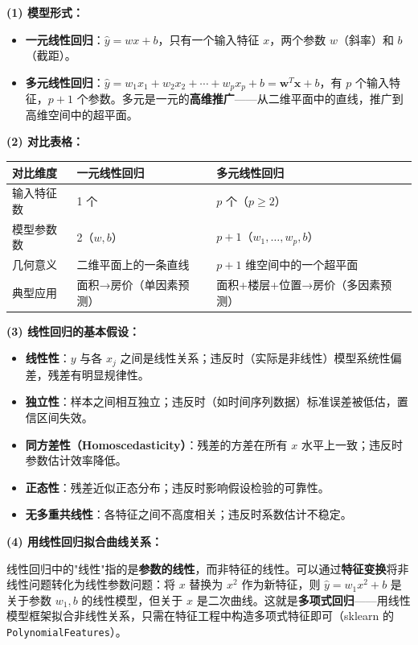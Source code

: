 \documentclass[a4paper,11pt]{ctexart}
\begin{document}
\begin{solutionbox}[参考答案与详细解析]
    \textbf{(1) 模型形式：}
    \begin{itemize}
        \item \textbf{一元线性回归}：$\hat{y} = wx + b$，只有一个输入特征 $x$，两个参数 $w$（斜率）和 $b$（截距）。
        \item \textbf{多元线性回归}：$\hat{y} = w_1 x_1 + w_2 x_2 + \cdots + w_p x_p + b = \boldsymbol{w}^T\boldsymbol{x} + b$，有 $p$ 个输入特征，$p+1$ 个参数。多元是一元的\textbf{高维推广}——从二维平面中的直线，推广到高维空间中的超平面。
    \end{itemize}

    \textbf{(2) 对比表格：}
    \begin{center}
    \begin{tabular}{p{3cm} p{4.5cm} p{4.5cm}}
        \toprule
        对比维度 & 一元线性回归 & 多元线性回归 \\
        \midrule
        输入特征数 & 1 个 & $p$ 个（$p \geq 2$） \\[0.6em]
        模型参数数 & 2（$w, b$） & $p+1$（$w_1,\ldots,w_p, b$） \\[0.6em]
        几何意义 & 二维平面上的一条直线 & $p+1$ 维空间中的一个超平面 \\[0.6em]
        典型应用 & 面积→房价（单因素预测） & 面积+楼层+位置→房价（多因素预测） \\
        \bottomrule
    \end{tabular}
    \end{center}

    \textbf{(3) 线性回归的基本假设：}
    \begin{itemize}
        \item \textbf{线性性}：$y$ 与各 $x_j$ 之间是线性关系；违反时（实际是非线性）模型系统性偏差，残差有明显规律性。
        \item \textbf{独立性}：样本之间相互独立；违反时（如时间序列数据）标准误差被低估，置信区间失效。
        \item \textbf{同方差性（Homoscedasticity）}：残差的方差在所有 $x$ 水平上一致；违反时参数估计效率降低。
        \item \textbf{正态性}：残差近似正态分布；违反时影响假设检验的可靠性。
        \item \textbf{无多重共线性}：各特征之间不高度相关；违反时系数估计不稳定。
    \end{itemize}

    \textbf{(4) 用线性回归拟合曲线关系：}

    线性回归中的"线性"指的是\textbf{参数的线性}，而非特征的线性。可以通过\textbf{特征变换}将非线性问题转化为线性参数问题：将 $x$ 替换为 $x^2$ 作为新特征，则 $\hat{y} = w_1 x^2 + b$ 是关于参数 $w_1, b$ 的线性模型，但关于 $x$ 是二次曲线。这就是\textbf{多项式回归}——用线性模型框架拟合非线性关系，只需在特征工程中构造多项式特征即可（sklearn 的 \texttt{PolynomialFeatures}）。
\end{solutionbox}
\end{document}
